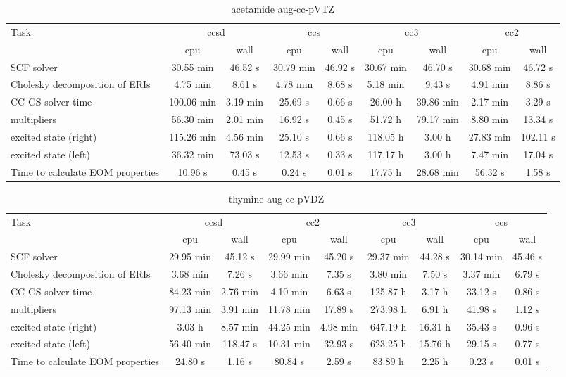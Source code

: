 \documentclass{article}
\begin{document}
\begin{table}
\caption{acetamide aug-cc-pVTZ}
\begin{tabular}{lcccccccc}
\toprule
Task & \multicolumn{2}{c}{ccsd} & \multicolumn{2}{c}{ccs} & \multicolumn{2}{c}{cc3} & \multicolumn{2}{c}{cc2}\\
\cmidrule(lr){2-3}\cmidrule(lr){4-5}\cmidrule(lr){6-7}\cmidrule(lr){8-9}
 & cpu & wall & cpu & wall & cpu & wall & cpu & wall\\
\midrule
SCF solver & 30.55 min & 46.52 s & 30.79 min & 46.92 s & 30.67 min & 46.70 s & 30.68 min & 46.72 s\\
Cholesky decomposition of ERIs & 4.75 min & 8.61 s & 4.78 min & 8.68 s & 5.18 min & 9.43 s & 4.91 min & 8.86 s\\
CC GS solver time & 100.06 min & 3.19 min & 25.69 s & 0.66 s & 26.00 h & 39.86 min & 2.17 min & 3.29 s\\
multipliers & 56.30 min & 2.01 min & 16.92 s & 0.45 s & 51.72 h & 79.17 min & 8.80 min & 13.34 s\\
excited state (right) & 115.26 min & 4.56 min & 25.10 s & 0.66 s & 118.05 h & 3.00 h & 27.83 min & 102.11 s\\
excited state (left) & 36.32 min & 73.03 s & 12.53 s & 0.33 s & 117.17 h & 3.00 h & 7.47 min & 17.04 s\\
Time to calculate EOM properties & 10.96 s & 0.45 s & 0.24 s & 0.01 s & 17.75 h & 28.68 min & 56.32 s & 1.58 s\\
\bottomrule
\end{tabular}
\end{table}
\begin{table}
\caption{thymine aug-cc-pVDZ}
\begin{tabular}{lcccccccc}
\toprule
Task & \multicolumn{2}{c}{ccsd} & \multicolumn{2}{c}{cc2} & \multicolumn{2}{c}{cc3} & \multicolumn{2}{c}{ccs}\\
\cmidrule(lr){2-3}\cmidrule(lr){4-5}\cmidrule(lr){6-7}\cmidrule(lr){8-9}
 & cpu & wall & cpu & wall & cpu & wall & cpu & wall\\
\midrule
SCF solver & 29.95 min & 45.12 s & 29.99 min & 45.20 s & 29.37 min & 44.28 s & 30.14 min & 45.46 s\\
Cholesky decomposition of ERIs & 3.68 min & 7.26 s & 3.66 min & 7.35 s & 3.80 min & 7.50 s & 3.37 min & 6.79 s\\
CC GS solver time & 84.23 min & 2.76 min & 4.10 min & 6.63 s & 125.87 h & 3.17 h & 33.12 s & 0.86 s\\
multipliers & 97.13 min & 3.91 min & 11.78 min & 17.89 s & 273.98 h & 6.91 h & 41.98 s & 1.12 s\\
excited state (right) & 3.03 h & 8.57 min & 44.25 min & 4.98 min & 647.19 h & 16.31 h & 35.43 s & 0.96 s\\
excited state (left) & 56.40 min & 118.47 s & 10.31 min & 32.93 s & 623.25 h & 15.76 h & 29.15 s & 0.77 s\\
Time to calculate EOM properties & 24.80 s & 1.16 s & 80.84 s & 2.59 s & 83.89 h & 2.25 h & 0.23 s & 0.01 s\\
\bottomrule
\end{tabular}
\end{table}
\end{document}
